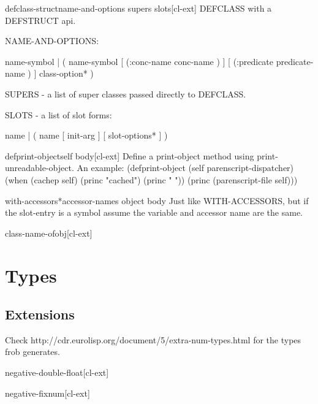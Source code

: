 \documentclass[10pt,english]{book}
\begin{document}
\begin{macro}{defclass-struct}{name-and-options supers \rest slots}[cl-ext]
  DEFCLASS with a DEFSTRUCT api.

NAME-AND-OPTIONS:

  name-symbol |
  ( name-symbol [ (:conc-name conc-name ) ]
                [ (:predicate predicate-name ) ]
                class-option* )

SUPERS - a list of super classes passed directly to DEFCLASS.

SLOTS - a list of slot forms:

  name |
  ( name [ init-arg ] [ slot-options* ] )
\end{macro}

\begin{macro}{defprint-object}{self \body body}[cl-ext]
  Define a print-object method using print-unreadable-object.
  An example:
  (defprint-object (self parenscript-dispatcher)
    (when (cachep self)
      (princ "cached")
      (princ " "))
    (princ (parenscript-file self)))
\end{macro}

\begin{macro}{with-accessors*}{accessor-names object \body body}
  Just like WITH-ACCESSORS, but if the slot-entry is a symbol assume
  the variable and accessor name are the same.
\end{macro}

\begin{function}{class-name-of}{obj}[cl-ext]
  
\end{function}





\chapter{Types}
\label{cha:types}

\section{Extensions}
\label{sec:extensions}

Check http://cdr.eurolisp.org/document/5/extra-num-types.html for the
types frob generates.

\begin{type}{negative-double-float}{}[cl-ext]
  
\end{type}

\begin{type}{negative-fixnum}{}[cl-ext]
  
\end{type}
\end{document}
